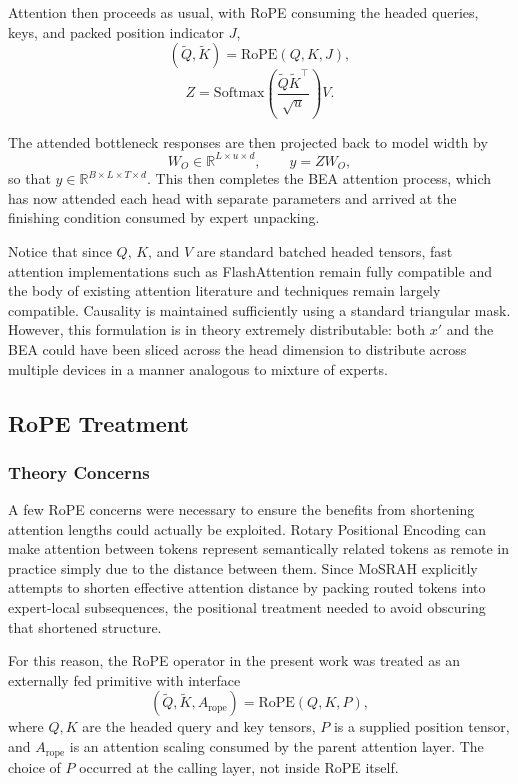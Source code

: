\documentclass[11pt]{article}
\begin{document}
Attention then proceeds as usual, with RoPE consuming the headed queries, keys, and packed position indicator $J$,
\[
(\tilde{Q}, \tilde{K}) = \mathrm{RoPE}(Q, K, J),
\]
\[
Z = \mathrm{Softmax}\!\left(\frac{\tilde{Q}\tilde{K}^{\top}}{\sqrt{u}}\right)V.
\]

The attended bottleneck responses are then projected back to model width by
\[
W_O \in \mathbb{R}^{L \times u \times d},
\qquad
y = Z W_O,
\]
so that $y \in \mathbb{R}^{B \times L \times T \times d}$. This then completes the BEA attention process, which has now attended each head with separate parameters and arrived at the finishing condition consumed by expert unpacking.

Notice that since $Q$, $K$, and $V$ are standard batched headed tensors, fast attention implementations such as FlashAttention remain fully compatible and the body of existing attention literature and techniques remain largely compatible. Causality is maintained sufficiently using a standard triangular mask. However, this formulation is in theory extremely distributable: both $x'$ and the BEA could have been sliced across the head dimension to distribute across multiple devices in a manner analogous to mixture of experts.

\subsection{RoPE Treatment}
\label{app:rope}

\subsubsection{Theory Concerns}

A few RoPE concerns were necessary to ensure the benefits from shortening attention lengths could actually be exploited. Rotary Positional Encoding can make attention between tokens represent semantically related tokens as remote in practice simply due to the distance between them. Since MoSRAH explicitly attempts to shorten effective attention distance by packing routed tokens into expert-local subsequences, the positional treatment needed to avoid obscuring that shortened structure.

For this reason, the RoPE operator in the present work was treated as an externally fed primitive with interface
\[
(\tilde{Q}, \tilde{K}, A_{\mathrm{rope}})=\mathrm{RoPE}(Q,K,P),
\]
where $Q,K$ are the headed query and key tensors, $P$ is a supplied position tensor, and $A_{\mathrm{rope}}$ is an attention scaling consumed by the parent attention layer. The choice of $P$ occurred at the calling layer, not inside RoPE itself.
\end{document}
